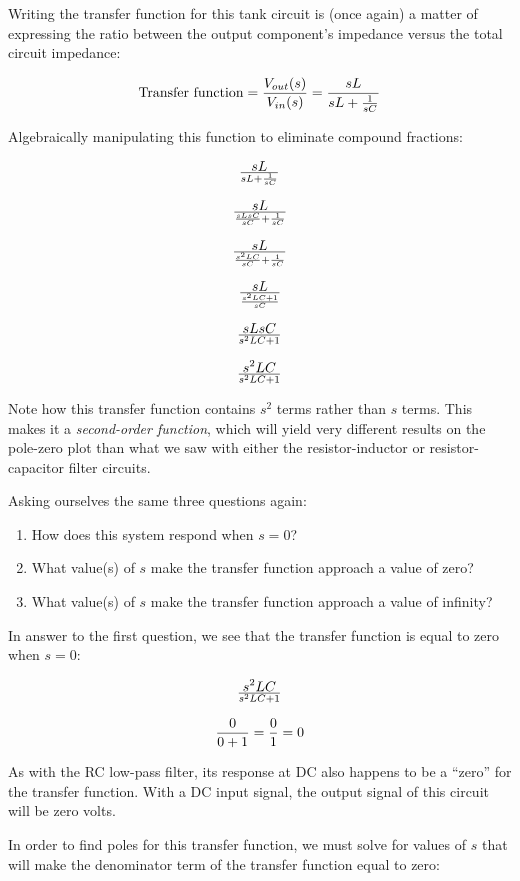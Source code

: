 Writing the transfer function for this tank circuit is (once again) a matter of expressing the ratio between the output component's impedance versus the total circuit impedance:

$$\hbox{Transfer function} = {V_{out}(s) \over V_{in}(s)} = {sL \over {sL + {1 \over sC}}}$$

Algebraically manipulating this function to eliminate compound fractions:

$$sL \over {sL + {1 \over sC}}$$

$$sL \over {{sLsC \over sC} + {1 \over sC}}$$

$$sL \over {{s^2LC \over sC} + {1 \over sC}}$$

$$sL \over {s^2LC + 1 \over sC}$$

$$sLsC \over {s^2LC + 1}$$

$$s^2LC \over {s^2LC + 1}$$

Note how this transfer function contains $s^2$ terms rather than $s$ terms.  This makes it a \textit{second-order function}, which will yield very different results on the pole-zero plot than what we saw with either the resistor-inductor or resistor-capacitor filter circuits.

\filbreak

Asking ourselves the same three questions again:

\begin{enumerate}
\item How does this system respond when $s = 0$?
\item What value(s) of $s$ make the transfer function approach a value of zero?
\item What value(s) of $s$ make the transfer function approach a value of infinity?
\end{enumerate}

\filbreak

In answer to the first question, we see that the transfer function is equal to zero when $s = 0$:

$$s^2LC \over {s^2LC + 1}$$

$${0 \over 0 + 1} = {0 \over 1} = 0$$

As with the RC low-pass filter, its response at DC also happens to be a ``zero'' for the transfer function.  With a DC input signal, the output signal of this circuit will be zero volts.    

\vskip 10pt

In order to find poles for this transfer function, we must solve for values of $s$ that will make the denominator term of the transfer function equal to zero:

